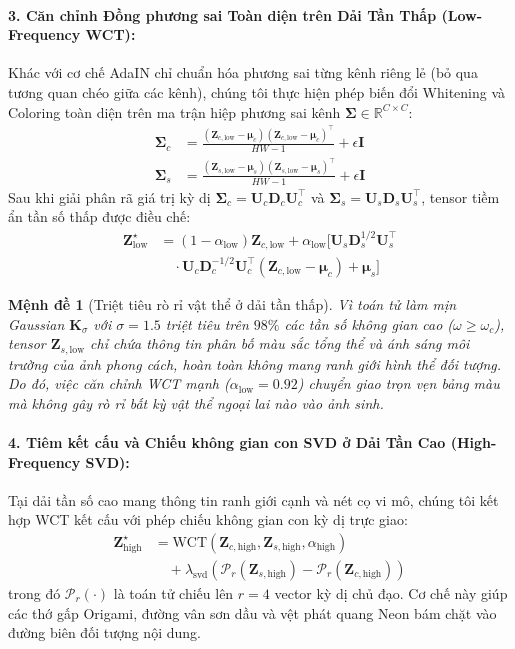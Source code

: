 \documentclass[10pt,twocolumn,letterpaper]{article}
\newtheorem{proposition}{Mệnh đề}
\begin{document}
\paragraph{3. Căn chỉnh Đồng phương sai Toàn diện trên Dải Tần Thấp (Low-Frequency WCT):}
Khác với cơ chế AdaIN chỉ chuẩn hóa phương sai từng kênh riêng lẻ (bỏ qua tương quan chéo giữa các kênh), chúng tôi thực hiện phép biến đổi Whitening và Coloring toàn diện trên ma trận hiệp phương sai kênh $\boldsymbol{\Sigma} \in \mathbb{R}^{C \times C}$:
\begin{align}
\boldsymbol{\Sigma}_c &= \frac{(\mathbf{Z}_{c, \text{low}} - \boldsymbol{\mu}_c)(\mathbf{Z}_{c, \text{low}} - \boldsymbol{\mu}_c)^\top}{HW - 1} + \epsilon \mathbf{I} \\
\boldsymbol{\Sigma}_s &= \frac{(\mathbf{Z}_{s, \text{low}} - \boldsymbol{\mu}_s)(\mathbf{Z}_{s, \text{low}} - \boldsymbol{\mu}_s)^\top}{HW - 1} + \epsilon \mathbf{I}
\end{align}
Sau khi giải phân rã giá trị kỳ dị $\boldsymbol{\Sigma}_c = \mathbf{U}_c \mathbf{D}_c \mathbf{U}_c^\top$ và $\boldsymbol{\Sigma}_s = \mathbf{U}_s \mathbf{D}_s \mathbf{U}_s^\top$, tensor tiềm ẩn tần số thấp được điều chế:
\begin{align}
\mathbf{Z}_{\text{low}}^\star &= (1 - \alpha_{\text{low}}) \mathbf{Z}_{c, \text{low}} + \alpha_{\text{low}} \Big[ \mathbf{U}_s \mathbf{D}_s^{1/2} \mathbf{U}_s^\top \nonumber \\
&\quad \cdot \mathbf{U}_c \mathbf{D}_c^{-1/2} \mathbf{U}_c^\top (\mathbf{Z}_{c, \text{low}} - \boldsymbol{\mu}_c) + \boldsymbol{\mu}_s \Big]
\end{align}
\begin{proposition}[Triệt tiêu rò rỉ vật thể ở dải tần thấp]
Vì toán tử làm mịn Gaussian $\mathbf{K}_\sigma$ với $\sigma = 1.5$ triệt tiêu trên $98\%$ các tần số không gian cao ($\omega \ge \omega_c$), tensor $\mathbf{Z}_{s, \text{low}}$ chỉ chứa thông tin phân bố màu sắc tổng thể và ánh sáng môi trường của ảnh phong cách, hoàn toàn không mang ranh giới hình thể đối tượng. Do đó, việc căn chỉnh WCT mạnh ($\alpha_{\text{low}} = 0.92$) chuyển giao trọn vẹn bảng màu mà không gây rò rỉ bất kỳ vật thể ngoại lai nào vào ảnh sinh.
\end{proposition}

\paragraph{4. Tiêm kết cấu và Chiếu không gian con SVD ở Dải Tần Cao (High-Frequency SVD):}
Tại dải tần số cao mang thông tin ranh giới cạnh và nét cọ vi mô, chúng tôi kết hợp WCT kết cấu với phép chiếu không gian con kỳ dị trực giao:
\begin{align}
\mathbf{Z}_{\text{high}}^\star &= \text{WCT}(\mathbf{Z}_{c, \text{high}}, \mathbf{Z}_{s, \text{high}}, \alpha_{\text{high}}) \nonumber \\
&\quad + \lambda_{\text{svd}} \left( \mathcal{P}_r(\mathbf{Z}_{s, \text{high}}) - \mathcal{P}_r(\mathbf{Z}_{c, \text{high}}) \right)
\end{align}
trong đó $\mathcal{P}_r(\cdot)$ là toán tử chiếu lên $r=4$ vector kỳ dị chủ đạo. Cơ chế này giúp các thớ gấp Origami, đường vân sơn dầu và vệt phát quang Neon bám chặt vào đường biên đối tượng nội dung.
\end{document}

